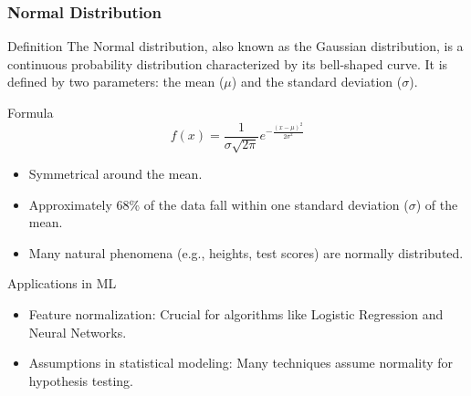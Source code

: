 \documentclass[aspectratio=169]{beamer}
\begin{document}
\begin{frame}[fragile]
    \frametitle{Normal Distribution}
    \begin{block}{Definition}
        The Normal distribution, also known as the Gaussian distribution, is a continuous probability distribution characterized by its bell-shaped curve. It is defined by two parameters: the mean ($\mu$) and the standard deviation ($\sigma$).
    \end{block}
    \begin{block}{Formula}
        \begin{equation}
            f(x) = \frac{1}{\sigma\sqrt{2\pi}} e^{-\frac{(x - \mu)^2}{2\sigma^2}}
        \end{equation}
    \end{block}
    \begin{itemize}
        \item Symmetrical around the mean.
        \item Approximately 68\% of the data fall within one standard deviation ($\sigma$) of the mean.
        \item Many natural phenomena (e.g., heights, test scores) are normally distributed.
    \end{itemize}
    \begin{block}{Applications in ML}
        \begin{itemize}
            \item Feature normalization: Crucial for algorithms like Logistic Regression and Neural Networks.
            \item Assumptions in statistical modeling: Many techniques assume normality for hypothesis testing.
        \end{itemize}
    \end{block}
\end{frame}
\end{document}
